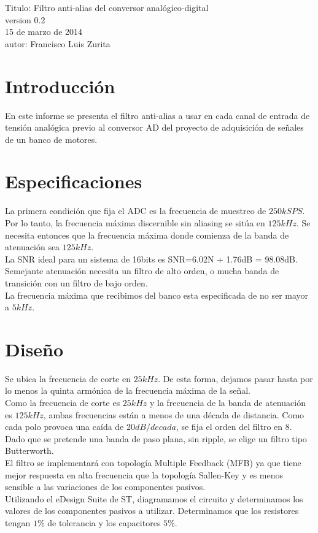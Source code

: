 \documentclass[12pt,a4paper]{article}
\begin{document}
\setlength{\parindent}{0cm}

Titulo: Filtro anti-alias del conversor analógico-digital\\
version 0.2\\
15 de marzo de 2014\\
autor: Francisco Luis Zurita\\

\section{\textbf{Introducción}}

En este informe se presenta el filtro anti-alias a usar en cada canal de entrada de tensión analógica previo al conversor AD del proyecto de adquisición de señales de un banco de motores.

\section{\textbf{Especificaciones}}

La primera condición que fija el ADC es la frecuencia de muestreo de $250kSPS$. Por lo tanto, la frecuencia máxima discernible sin aliasing se sitúa en $125kHz$\cite{RM}. Se necesita entonces que la frecuencia máxima donde comienza de la banda de atenuación sea $125kHz$.\\ 
La SNR ideal para un sistema de 16bits es SNR=6.02N + 1.76dB = 98.08dB.\cite{SNR} Semejante atenuación necesita un filtro de alto orden, o mucha banda de transición con un filtro de bajo orden.\\
La frecuencia máxima que recibimos del banco esta especificada de no ser mayor a $5kHz$.

\section{\textbf{Diseño}}

Se ubica la frecuencia de corte en $25kHz$. De esta forma, dejamos pasar hasta por lo menos la quinta armónica de la frecuencia máxima de la señal.\\
Como la frecuencia de corte es $25kHz$ y la frecuencia de la banda de atenuación es $125kHz$, ambas frecuencias están a menos de una década de distancia. Como cada polo provoca una caída de $20dB/decada$, se fija el orden del filtro en 8. Dado que se pretende una banda de paso plana, sin ripple, se elige un filtro tipo Butterworth.\cite{BB}\\
El filtro se implementará con topología Multiple Feedback (MFB) ya que tiene mejor respuesta en alta frecuencia que la topología Sallen-Key y es menos sensible a las variaciones de los componentes pasivos.\cite{MFB}\\
Utilizando el eDesign Suite de ST,\cite{eDS} diagramamos el circuito y determinamos los valores de los componentes pasivos a utilizar. Determinamos que los resistores tengan $1\%$ de tolerancia y los capacitores $5\%$.\\
\end{document}
